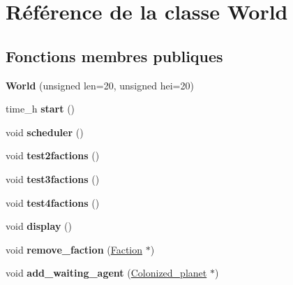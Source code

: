\hypertarget{classWorld}{\section{Référence de la classe World}
\label{classWorld}
}
\subsection*{Fonctions membres publiques}
\begin{DoxyCompactItemize}
\item 
\hypertarget{classWorld_ac6dabb39d0af2594d84dde35ec79c585}{{\bfseries World} (unsigned len=20, unsigned hei=20)}\label{classWorld_ac6dabb39d0af2594d84dde35ec79c585}

\item 
\hypertarget{classWorld_a6d23268873d3e6dc117d6c76fc87626b}{time\-\_\-h {\bfseries start} ()}\label{classWorld_a6d23268873d3e6dc117d6c76fc87626b}

\item 
\hypertarget{classWorld_a26aa2658c22414b5f572df8cb5efbeae}{void {\bfseries scheduler} ()}\label{classWorld_a26aa2658c22414b5f572df8cb5efbeae}

\item 
\hypertarget{classWorld_af50a03db2f7a2fea3a013557251d5a7c}{void {\bfseries test2factions} ()}\label{classWorld_af50a03db2f7a2fea3a013557251d5a7c}

\item 
\hypertarget{classWorld_aeff7e2c21e886b7a7d5793354644858f}{void {\bfseries test3factions} ()}\label{classWorld_aeff7e2c21e886b7a7d5793354644858f}

\item 
\hypertarget{classWorld_ae093b6af05143a8faa53db9774eb77ff}{void {\bfseries test4factions} ()}\label{classWorld_ae093b6af05143a8faa53db9774eb77ff}

\item 
\hypertarget{classWorld_a007f9908bb224a8fb4b6b58820971eed}{void {\bfseries display} ()}\label{classWorld_a007f9908bb224a8fb4b6b58820971eed}

\item 
\hypertarget{classWorld_ab01f5891ce4a1532563b4674de788daf}{void {\bfseries remove\-\_\-faction} (\hyperlink{classFaction}{Faction} $\ast$)}\label{classWorld_ab01f5891ce4a1532563b4674de788daf}

\item 
\hypertarget{classWorld_adfedeb704ce247d881bd9565d9d867d4}{void {\bfseries add\-\_\-waiting\-\_\-agent} (\hyperlink{classColonized__planet}{Colonized\-\_\-planet} $\ast$)}\label{classWorld_adfedeb704ce247d881bd9565d9d867d4}


\end{DoxyCompactItemize}
